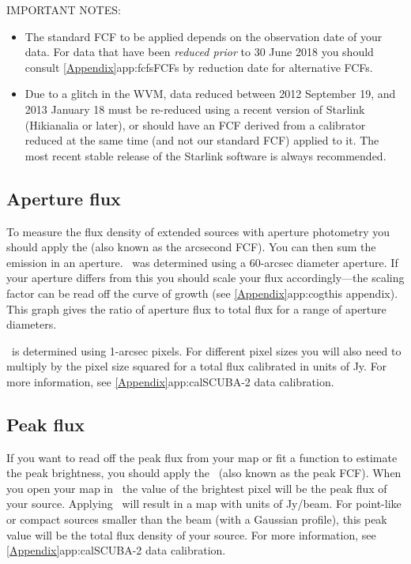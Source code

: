 \begin{sltextbox}{IMPORTANT NOTES:}
  \begin{itemize}
  \item The standard FCF to be applied depends on the observation date
    of your data. For data that have been \emph{reduced prior} to
    30 June 2018 you should consult \cref{Appendix}{app:fcfs}{FCFs by
      reduction date} for alternative FCFs.

  \item Due to a glitch in the WVM, data reduced between 2012
    September 19, and 2013 January 18 must be re-reduced using a
    recent version of Starlink (Hikianalia or later), or should have
    an FCF derived from a calibrator reduced at the same time (and not
    our standard FCF) applied to it. The most recent stable release of
    the Starlink software is always recommended.
  \end{itemize}
\end{sltextbox}


\subsection{Aperture flux}

To measure the flux density of extended sources with aperture photometry
you should apply the \fcfa (also known as the arcsecond FCF).  
You can then sum the emission in an
aperture. \fcfa\ was determined using a 60-arcsec diameter
aperture. If your aperture differs from this you should scale your
flux accordingly---the scaling factor can be read off the curve of
growth (see \cref{Appendix}{app:cog}{this appendix}). This graph gives
the ratio of aperture flux to total flux for a range of aperture
diameters.

\fcfa\ is determined using 1-arcsec pixels. For different pixel sizes
you will also need to multiply by the pixel size squared for a total
flux calibrated in units of Jy. For more information, see 
\cref{Appendix}{app:cal}{SCUBA-2 data calibration}.

\subsection{Peak flux}

If you want to read off the peak flux from your map or fit
a function to estimate the peak brightness, you should apply
the \fcfb\ (also known as the peak FCF).  When you open your map in
\gaia\ the value of the brightest pixel will be the peak flux of your
source. Applying \fcfb\ will result in a map with
units of Jy/beam. For point-like or compact sources smaller than the
beam (with a Gaussian profile), this peak value will be the total flux
density of your source. For more information, see
\cref{Appendix}{app:cal}{SCUBA-2 data calibration}.

